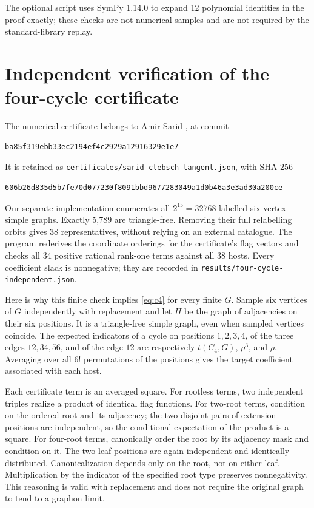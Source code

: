 \documentclass[12pt]{article}
\begin{document}
The optional script  uses SymPy 1.14.0 to expand
12 polynomial identities in the proof exactly; these checks are not
numerical samples and are not required by the standard-library replay.

\section{Independent verification of the four-cycle certificate}\label{app:c4}
The numerical certificate belongs to Amir Sarid \cite{sarid}, at commit
\begin{lstlisting}
ba85f319ebb33ec2194ef4c2929a12916329e1e7
\end{lstlisting}
It is retained as \texttt{certificates/sarid-clebsch-tangent.json}, with
SHA-256
\begin{lstlisting}
606b26d835d5b7fe70d077230f8091bbd9677283049a1d0b46a3e3ad30a200ce
\end{lstlisting}
Our separate implementation enumerates all $2^{15}=32768$ labelled
six-vertex simple graphs. Exactly 5,789 are triangle-free. Removing their
full relabelling orbits gives 38 representatives, without relying on an
external catalogue. The program rederives the coordinate orderings for
the certificate's flag vectors and checks all 34 positive rational
rank-one terms against all 38 hosts. Every coefficient slack is
nonnegative; they are recorded in \texttt{results/four-cycle-independent.json}.

Here is why this finite check implies \eqref{eq:c4} for every finite $G$.
Sample six vertices of $G$ independently with replacement and let $H$ be
the graph of adjacencies on their six positions. It is a triangle-free
simple graph, even when sampled vertices coincide. The expected
indicators of a cycle on positions $1,2,3,4$, of the three edges
$12,34,56$, and of the edge $12$ are respectively
$t(C_4,G)$, $\rho^3$, and $\rho$. Averaging over all $6!$ permutations
of the positions gives the target coefficient associated with each host.

Each certificate term is an averaged square. For rootless terms, two
independent triples realize a product of identical flag functions.
For two-root terms, condition on the ordered root and its adjacency;
the two disjoint pairs of extension positions are independent, so the
conditional expectation of the product is a square. For four-root
terms, canonically order the root by its adjacency mask and condition
on it. The two leaf positions are again independent and identically
distributed. Canonicalization depends only on the root, not on either
leaf. Multiplication by the indicator of the specified root type
preserves nonnegativity. This reasoning is valid with replacement and
does not require the original graph to tend to a graphon limit.
\end{document}
